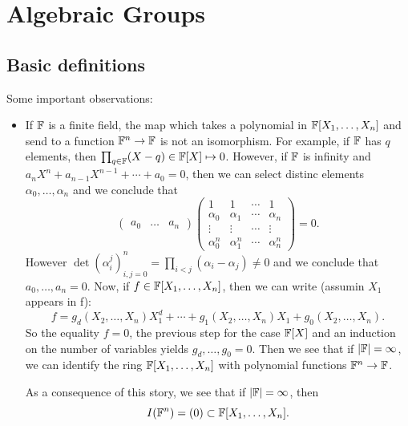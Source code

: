 \chapter{Algebraic Groups}
\section{Basic definitions}
Some important observations:
\begin{itemize}
    \item If $\mathbb{F}$ is a finite field, the map which takes a polynomial in $\mathbb{F}[X_1,\dots,X_n]$ and 
    send to a function $\mathbb{F}^n\to \mathbb{F}$ is not an isomorphism. For example, if $\mathbb{F}$ 
    has $q$ elements, then $\prod_{q\in\mathbb{F}}(X-q)\in\mathbb{F}[X]\mapsto 0$. However, if $\mathbb{F}$ is infinity and 
    $a_nX^n + a_{n-1}X^{n-1}+\cdots + a_0 = 0$, then we can select distinc elements $\alpha_0,\dots,\alpha_{n}$ and 
    we conclude that 
    \begin{equation}
        \begin{pmatrix}a_0&\dots&a_n\end{pmatrix}
       \begin{pmatrix}
            1&1&\cdots&1\\\alpha_0&\alpha_1&\cdots&\alpha_{n}\\\vdots&\vdots&\cdots&\vdots\\
            \alpha_0^n&\alpha_1^n&\cdots&\alpha_{n}^{n}
        \end{pmatrix}=0.
    \end{equation}
    However $\det(\alpha_i^j)_{i,j=0}^n=\prod_{i<j}(\alpha_i-\alpha_j)\neq0$ and we conclude that $a_0,\dots,a_n=0$. 
    Now, if $f\in \mathbb{F}[X_1,\dots,X_n]$, then we can write (assumin $X_1$ appears in f):
    \begin{equation}
        f = g_d(X_2,\dots,X_n)X_1^d +\cdots + g_1(X_2,\dots,X_n)X_1 + g_0(X_2,\dots,X_n).
    \end{equation}
    So the equality $f=0$, the previous step for the case $\mathbb{F}[X]$ and an induction on the number of variables yields
    $g_d,\dots,g_0 =0$. Then we see that if $|\mathbb{F}|=\infty$, we can identify the ring $\mathbb{F}[X_1,\dots,X_n]$ with 
    polynomial functions $\mathbb{F}^n\to\mathbb{F}$.\par 

    As a consequence of this story, we see that if $|\mathbb{F}|=\infty$, then 
    \begin{equation}
        I(\mathbb{F}^n)=(0)\subset\mathbb{F}[X_1,\dots,X_n].
    \end{equation}


\end{itemize}
